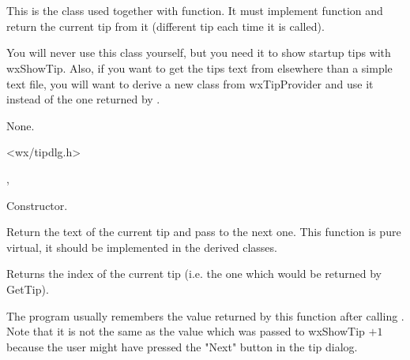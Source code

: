 \section{}\label{wxtipprovider}

This is the class used together with  function.
It must implement  function and return the
current tip from it (different tip each time it is called).

You will never use this class yourself, but you need it to show startup tips
with wxShowTip. Also, if you want to get the tips text from elsewhere than a
simple text file, you will want to derive a new class from wxTipProvider and
use it instead of the one returned by 
.


None.


<wx/tipdlg.h>


, 


\label{wxtipproviderctor}


Constructor.




Return the text of the current tip and pass to the next one. This function is
pure virtual, it should be implemented in the derived classes.



Returns the index of the current tip (i.e. the one which would be returned by
GetTip).

The program usually remembers the value returned by this function after calling 
. Note that it is not the same as the value which
was passed to wxShowTip $+ 1$ because the user might have pressed the "Next"
button in the tip dialog.
